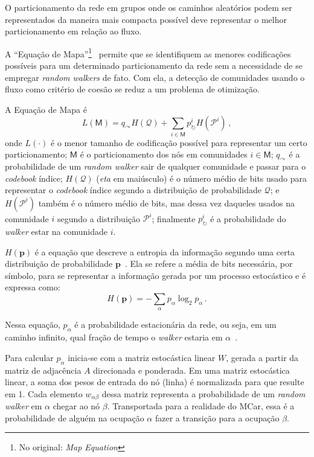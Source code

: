 \documentclass[12pt,a4paper]{article}
\begin{document}
O particionamento da rede em grupos onde os caminhos aleatórios podem ser representados da maneira mais compacta possível deve representar o melhor particionamento em relação ao fluxo.

A \enquote{Equação de Mapa}\footnote{No original: \textit{Map Equation}}~\cite{Rosvall2009-sd} permite que se identifiquem as menores codificações possíveis para um determinado particionamento da rede sem a necessidade de se empregar \textit{random walkers} de fato. Com ela, a detecção de comunidades usando o fluxo como critério de coesão se reduz a um problema de otimização.

A Equação de Mapa é
\begin{equation} \label{eq:map-equation}
L(\mathsf{M}) = q_\curvearrowright H(\mathcal{Q}) + \sum_{i \in \mathsf{M}} p^i_\circlearrowright H(\mathcal{P}^i)\,,
\end{equation}
onde $L(\cdot)$ é o menor tamanho de codificação possível para representar um certo particionamento; $\mathsf{M}$ é o particionamento dos nós em comunidades $i \in \mathsf{M}$; $q_\curvearrowright$ é a probabilidade de um \textit{random walker} sair de qualquer comunidade e passar para o \textit{codebook} índice; $H(\mathcal{Q})$ (\textit{eta} em maiúsculo) é o número médio de bits usado para representar o \textit{codebook} índice segundo a distribuição de probabilidade $\mathcal{Q}$; e $H(\mathcal{P}^i)$ também é o número médio de bits, mas dessa vez daqueles usados na comunidade $i$ segundo a distribuição $\mathcal{P}^i$; finalmente $p^i_\circlearrowright$ é a probabilidade do \textit{walker} estar na comunidade $i$.

$H(\textbf{p})$ é a equação que descreve a entropia da informação segundo uma certa distribuição de probabilidade $\textbf{p}$~\cite{Shannon1948-ic}. Ela se refere a média de bits necessária, por símbolo, para se representar a informação gerada por um processo estocástico e é expressa como:
\begin{equation*}
H(\textbf{p}) = - \sum_\alpha p_\alpha \log_2 p_\alpha\,.
\end{equation*}

Nessa equação, $p_\alpha$ é a probabilidade estacionária da rede, ou seja, em um caminho infinito, qual fração de tempo o \textit{walker} estaria em $\alpha$~\cite{Rosvall2009-sd}.

Para calcular $p_\alpha$ inicia-se com a matriz estocástica linear $W$, gerada a partir da matriz de adjacência $A$ direcionada e ponderada. Em uma matriz estocástica linear, a soma dos pesos de entrada do nó (linha) é normalizada para que resulte em 1. Cada elemento $w_{\alpha \beta}$ dessa matriz representa a probabilidade de um \textit{random walker}  em $\alpha$ chegar ao nó $\beta$. Transportada para a realidade do MCar, essa é a probabilidade de alguém na ocupação $\alpha$ fazer a transição para a ocupação $\beta$.
\end{document}

